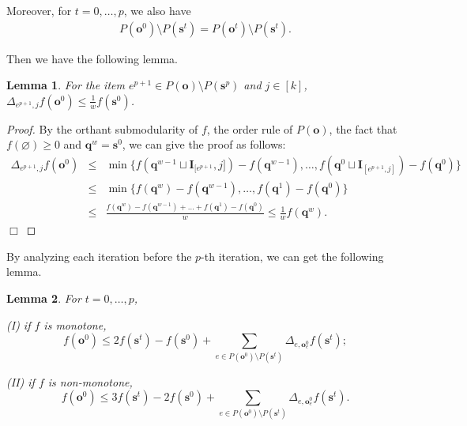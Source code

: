\documentclass[preprint,12pt]{elsarticle}
\newtheorem{lemma}{Lemma}
\def\bea{\begin{eqnarray}}
\def\eea{\end{eqnarray}}
\def\nn{\nonumber}
\def\endzm{\hfill $\Box$ \bigskip}
\def\bo{\boldsymbol{o}}
\def\bs{\boldsymbol{s}}
\def\bq{\boldsymbol{q}}
\def\bI{\boldsymbol{I}}
\begin{document}
Moreover, for $t=0, \dots, p$, we also have
\bea\label{(supp-t)}
P(\bo^0)\setminus P(\bs^t) = P(\bo^t) \setminus P(\bs^t ).
\eea

Then we have the following lemma.
\begin{lemma}\label{lem123}
For the item $e^{p+1}\in P(\bo)\setminus P(\bs^{p})$ and $j\in [k]$, $\Delta_{e^{p+1}, j} f(\bo^0) \le \frac{1}{w}f(\bs^0)$.
\end{lemma}
\begin{proof}
By the orthant submodularity of $f$, the order rule of $P(\bo)$, the fact that $f(\varnothing)\geq 0$ and $\bq^w=\bs^0$, we can give the proof as follows:
\bea
\Delta_{e^{p+1} , j} f( \bo^0 )
&\le& \min\{f( \bq^{w-1} \sqcup \bI_{[e^{p+1}} ,j] ) - f( \bq^{w-1} ), \dots, f(\bq^0 \sqcup \bI_{[e^{p+1} ,j]})-f( \bq^0 ) \} \nn\\
&\leq& \min\{f( \bq^w )-f(\bq^{w-1}), \dots, f( \bq^1 )-f(\bq^0 ) \} \nn\\
&\leq& \frac{f( \bq^w ) - f( \bq^{w-1} ) + \dots + f( \bq^1 ) - f(\bq^0)}{w} \leq \frac{1}{w} f( \bq^w ).\nn
\eea
\endzm
\end{proof}

By analyzing each iteration before the $p$-th iteration, we can get the following lemma.
\begin{lemma}\label{lem1}
For $t=0, \dots, p$,

{\rm (I)} if $f$ is monotone,
\[
f(\bo^0)\le 2f(\bs^t)-f(\bs^0)+\sum_{e\in P(\bo^0)\setminus P(\bs^t)}\Delta_{e, \bo^0_e}f(\bs^t);
\]

{\rm (II)} if $f$ is non-monotone,
\[
f(\bo^0)\le3f(\bs^t)-2f(\bs^0)+\sum_{e\in P(\bo^0)\setminus P(\bs^t)}\Delta_{e, \bo^0_e}f(\bs^t). \]
\end{lemma}
\end{document}
